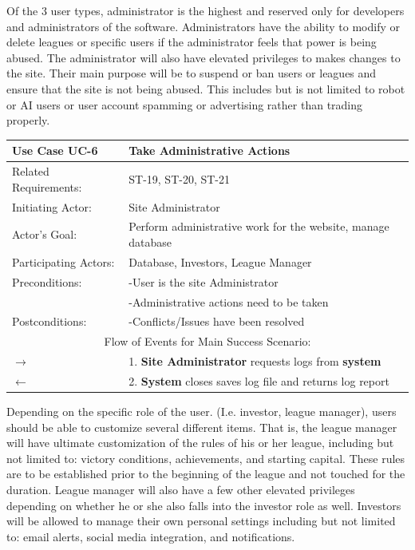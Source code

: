 Of the 3 user types, administrator is the highest and reserved only for developers and
administrators of the software. Administrators have the ability to modify or delete leagues
or specific users if the administrator feels that power is being abused. The administrator
will also have elevated privileges to makes changes to the site. Their main purpose will be to
suspend or ban users or leagues and ensure that the site is not being abused. This includes but
is not limited to robot or AI users or user account spamming or advertising rather than trading
properly. \\

\begin{centering}
\renewcommand\arraystretch{1.3} %
\label{UC-6}
\begin{longtable}{|p{1.2in} p{5in}|}
\hline
\bfseries{\color{color1}Use Case UC-6} &
\bfseries{\color{color1}Take Administrative Actions} \\
\hline
Related Requirements: & ST-19, ST-20, ST-21 \\
Initiating Actor:     & Site Administrator \\
Actor's Goal:         & Perform administrative work for the website, manage database \\
Participating Actors: & Database, Investors, League Manager \\
Preconditions:        & -User is the site Administrator \\
                      & -Administrative actions need to be taken \\
Postconditions:       & -Conflicts/Issues have been resolved \\
\hline
\multicolumn{2}{|c|}{\color{color1}Flow of Events for Main Success Scenario:}\\
\hline

$\rightarrow$ & 1. \textbf{Site Administrator} requests logs from \textbf{system} \\
$\leftarrow$ & 2. \textbf{System} closes saves log file and returns log report \\
\hline

\end{longtable}
\end{centering}

Depending on the specific role of the user. (I.e. investor, league manager), users should be
able to customize several different items. That is, the league manager will have ultimate
customization of the rules of his or her league, including but not limited to: victory
conditions, achievements, and starting capital. These rules are to be established prior to
the beginning of the league and not touched for the duration. League manager will also have a
few other elevated privileges depending on whether he or she also falls into the investor role
as well. Investors will be allowed to manage their own personal settings including but not
limited to: email alerts, social media integration, and notifications.\\

